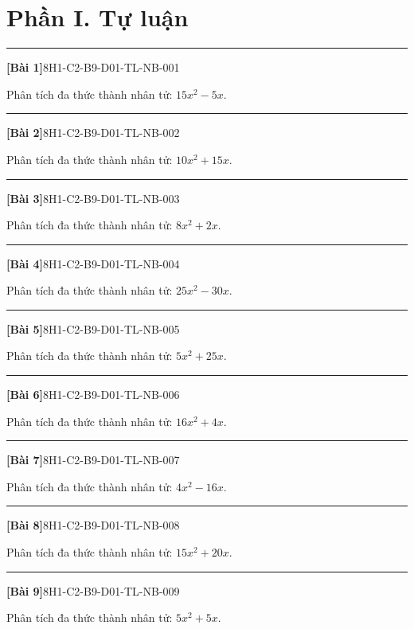 \documentclass[12pt,a4paper]{article}
\newif\ifloigiai
\newenvironment{cauhoi}[2]{%
  \par\medskip\noindent\rule{\textwidth}{0.4pt}\par\nopagebreak
  \noindent\textbf{[#1]}\hfill{\scriptsize\ttfamily #2}\par\nopagebreak\smallskip}{\par}
\newcommand{\loigiai}[1]{\ifloigiai\par\smallskip\noindent\textit{Lời giải.} #1\par\fi}
\begin{document}
\section*{Phần I. Tự luận}
\begin{cauhoi}{Bài 1}{8H1-C2-B9-D01-TL-NB-001}
Phân tích đa thức thành nhân tử: $15x^{2} - 5x$.
\loigiai{Nhân tử chung của các hạng tử là $5x$. Vậy $15x^{2} - 5x=5x(3x - 1)$.}
\end{cauhoi}
\begin{cauhoi}{Bài 2}{8H1-C2-B9-D01-TL-NB-002}
Phân tích đa thức thành nhân tử: $10x^{2} + 15x$.
\loigiai{Nhân tử chung của các hạng tử là $5x$. Vậy $10x^{2} + 15x=5x(2x + 3)$.}
\end{cauhoi}
\begin{cauhoi}{Bài 3}{8H1-C2-B9-D01-TL-NB-003}
Phân tích đa thức thành nhân tử: $8x^{2} + 2x$.
\loigiai{Nhân tử chung của các hạng tử là $2x$. Vậy $8x^{2} + 2x=2x(4x + 1)$.}
\end{cauhoi}
\begin{cauhoi}{Bài 4}{8H1-C2-B9-D01-TL-NB-004}
Phân tích đa thức thành nhân tử: $25x^{2} - 30x$.
\loigiai{Nhân tử chung của các hạng tử là $5x$. Vậy $25x^{2} - 30x=5x(5x - 6)$.}
\end{cauhoi}
\begin{cauhoi}{Bài 5}{8H1-C2-B9-D01-TL-NB-005}
Phân tích đa thức thành nhân tử: $5x^{2} + 25x$.
\loigiai{Nhân tử chung của các hạng tử là $5x$. Vậy $5x^{2} + 25x=5x(x + 5)$.}
\end{cauhoi}
\begin{cauhoi}{Bài 6}{8H1-C2-B9-D01-TL-NB-006}
Phân tích đa thức thành nhân tử: $16x^{2} + 4x$.
\loigiai{Nhân tử chung của các hạng tử là $4x$. Vậy $16x^{2} + 4x=4x(4x + 1)$.}
\end{cauhoi}
\begin{cauhoi}{Bài 7}{8H1-C2-B9-D01-TL-NB-007}
Phân tích đa thức thành nhân tử: $4x^{2} - 16x$.
\loigiai{Nhân tử chung của các hạng tử là $4x$. Vậy $4x^{2} - 16x=4x(x - 4)$.}
\end{cauhoi}
\begin{cauhoi}{Bài 8}{8H1-C2-B9-D01-TL-NB-008}
Phân tích đa thức thành nhân tử: $15x^{2} + 20x$.
\loigiai{Nhân tử chung của các hạng tử là $5x$. Vậy $15x^{2} + 20x=5x(3x + 4)$.}
\end{cauhoi}
\begin{cauhoi}{Bài 9}{8H1-C2-B9-D01-TL-NB-009}
Phân tích đa thức thành nhân tử: $5x^{2} + 5x$.
\loigiai{Nhân tử chung của các hạng tử là $5x$. Vậy $5x^{2} + 5x=5x(x + 1)$.}
\end{cauhoi}
\end{document}
